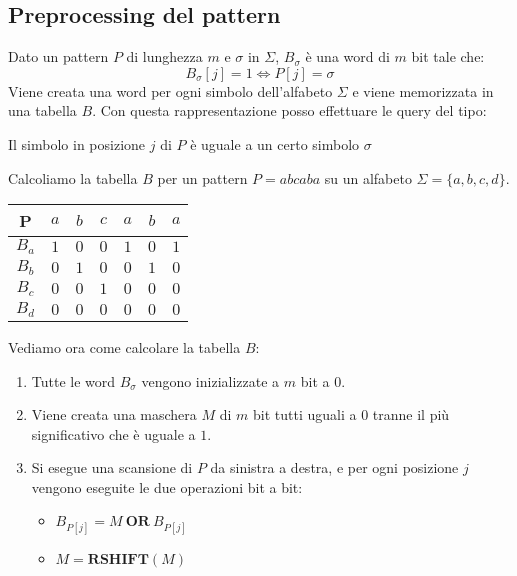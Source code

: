 \subsection{Preprocessing del pattern}
Dato un pattern $P$ di lunghezza $m$ e $\sigma$ in $\Sigma$, $B_{\sigma}$ è una
word di $m$ bit tale che:
\begin{equation}
    B_{\sigma}[j] = 1 \iff P[j] = \sigma
\end{equation}
Viene creata una word per ogni simbolo dell'alfabeto $\Sigma$ e viene memorizzata
in una tabella $B$. Con questa rappresentazione posso effettuare le query del tipo:
\begin{center}
    Il simbolo in posizione $j$ di $P$ è uguale a un certo simbolo $\sigma$
\end{center}
\begin{esempio}
    Calcoliamo la tabella $B$ per un pattern $P=abcaba$ su un alfabeto $\Sigma =
        \{a, b, c, d\}$.
    \begin{table}[!ht]
        \centering
        \begin{tabular}{|c|c|c|c|c|c|c|}
            \hline
            P     & $a$ & $b$ & $c$ & $a$ & $b$ & $a$ \\ \hline
            $B_a$ & $1$ & $0$ & $0$ & $1$ & $0$ & $1$ \\ \hline
            $B_b$ & $0$ & $1$ & $0$ & $0$ & $1$ & $0$ \\ \hline
            $B_c$ & $0$ & $0$ & $1$ & $0$ & $0$ & $0$ \\ \hline
            $B_d$ & $0$ & $0$ & $0$ & $0$ & $0$ & $0$ \\ \hline
        \end{tabular}
    \end{table}
\end{esempio}
Vediamo ora come calcolare la tabella $B$:
\begin{enumerate}
    \item Tutte le word $B_{\sigma}$ vengono inizializzate a $m$ bit a $0$.
    \item Viene creata una maschera $M$ di $m$ bit tutti uguali a $0$ tranne il
          più significativo che è uguale a $1$.
    \item Si esegue una scansione di $P$ da sinistra a destra, e per ogni posizione
          $j$ vengono eseguite le due operazioni bit a bit:
          \begin{itemize}
              \item $B_{P[j]} = M \ \textbf{OR} \ B_{P[j]}$
              \item $M = \textbf{RSHIFT} (M)$
          \end{itemize}
\end{enumerate}
